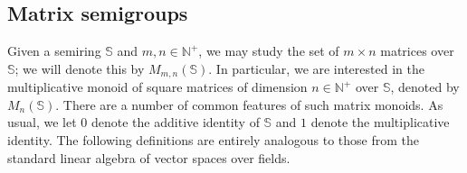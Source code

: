 \documentclass[11pt]{article}
\newcommand{\defn}[1]{\textbf{\textit{#1}}}
\numberwithin{equation}{section}
\renewcommand{\to}{\longrightarrow}
\newcommand{\N}{\mathbb{N}}
\newcommand{\Np}{\N^{+}}
\newcommand{\Z}{\mathbb{Z}}
\newcommand{\K}{\mathbb{K}}
\newcommand{\Kmaxt}{\K^{-\infty}_t}
\begin{document}
%
%

\subsection{Matrix semigroups}
\label{sec:matsemigp}
Given a semiring $\mathbb{S}$ and $m, n \in \Np$, we may study the set of $m
\times n$ matrices over $\mathbb{S}$; we will denote this by $M_{m,
  n}(\mathbb{S})$. In particular, we are interested in the multiplicative monoid
of square matrices of dimension $n \in \Np$ over $\mathbb{S}$, denoted by
$M_n(\mathbb{S})$.  There are a number of common features of such matrix
monoids. As usual, we let $0$ denote the additive identity of $\mathbb{S}$ and
$1$ denote the multiplicative identity. The following definitions are entirely
analogous to those from the standard linear algebra of vector spaces over
fields.
\end{document}
